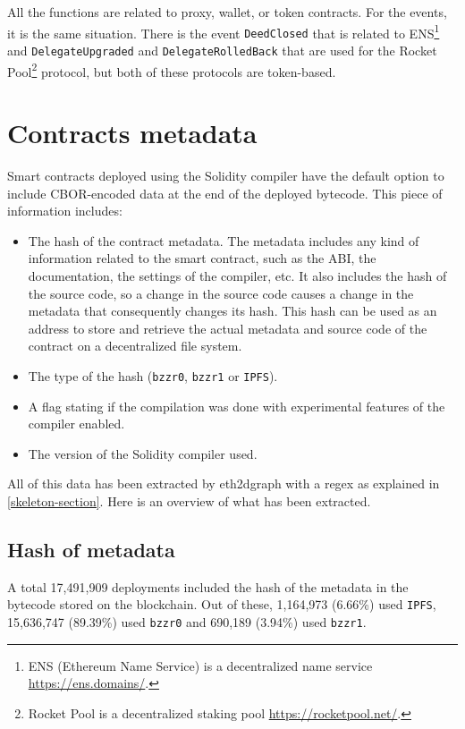All the functions are related to proxy, wallet, or token contracts. For the events, it is the same situation. There is the event {\tt DeedClosed} that is related to ENS\footnote{ENS (Ethereum Name Service) is a decentralized name service \url{https://ens.domains/}.} and  {\tt DelegateUpgraded} and {\tt DelegateRolledBack} that are used for the Rocket Pool\footnote{Rocket Pool is a decentralized staking pool \url{https://rocketpool.net/}.} protocol, but both of these protocols are token-based.

\newpage

\section{Contracts metadata}

Smart contracts deployed using the Solidity compiler have the default option to include CBOR-encoded data at the end of the deployed bytecode. This piece of information includes:

\begin{itemize}
    \item The hash of the contract metadata. The metadata includes any kind of information related to the smart contract, such as the ABI, the documentation, the settings of the compiler, etc. It also includes the hash of the source code, so a change in the source code causes a change in the metadata that consequently changes its hash. This hash can be used as an address to store and retrieve the actual metadata and source code of the contract on a decentralized file system.
    \item The type of the hash ({\tt bzzr0}, {\tt bzzr1} or {\tt IPFS}).
    \item A flag stating if the compilation was done with experimental features of the compiler enabled.
    \item The version of the Solidity compiler used.
\end{itemize}

All of this data has been extracted by eth2dgraph with a regex as explained in \cref{skeleton-section}. Here is an overview of what has been extracted.

\subsection{Hash of metadata}

A total 17,491,909 deployments included the hash of the metadata in the bytecode stored on the blockchain. Out of these, 1,164,973 (6.66\%) used {\tt IPFS}, 15,636,747 (89.39\%) used {\tt bzzr0} and 690,189 (3.94\%) used {\tt bzzr1}. 

